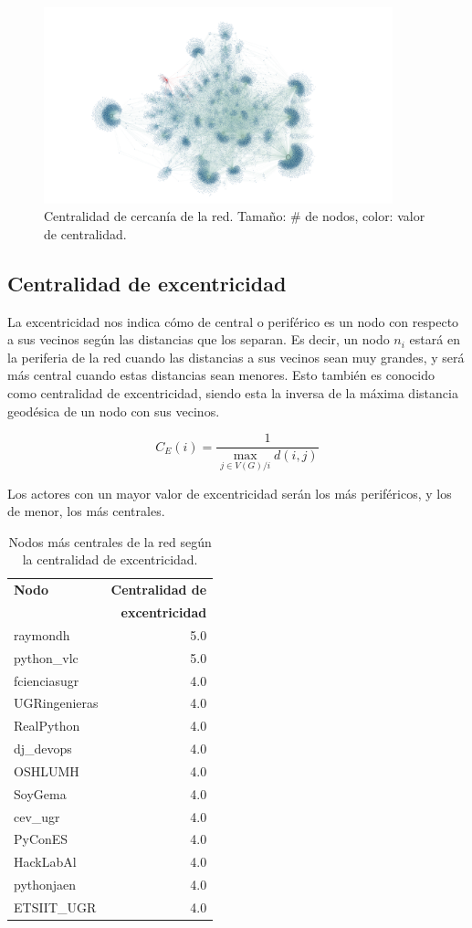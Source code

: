 \documentclass[paper=a4, fontsize=11pt]{article} %
\numberwithin{equation}{section} %
\numberwithin{figure}{section} %
\numberwithin{table}{section} %
\begin{document}
\begin{figure}[H]
  \centering
  \includegraphics[width=0.9\textwidth]{../Visualizaciones/close}
  \caption{Centralidad de cercanía de la red. Tamaño: \# de nodos, color: valor de centralidad.}
  \label{im4}
\end{figure}


\subsection{Centralidad de excentricidad}

La excentricidad nos indica cómo de central o periférico es un nodo con respecto a sus vecinos según las distancias que los separan. Es decir, un nodo $n_i$ estará en la periferia de la red cuando las distancias a sus vecinos sean muy grandes, y será más central cuando estas distancias sean menores. Esto también es conocido como centralidad de excentricidad, siendo esta la inversa de la máxima distancia geodésica de un nodo con sus vecinos.

\begin{displaymath}
  C_E(i) = \frac{1}{\max_{j \in V(G)/i}d(i,j)}
\end{displaymath}

Los actores con un mayor valor de excentricidad serán los más periféricos, y los de menor, los más centrales.

\begin{table}[H]
\begin{tabular}{l|r}
\textbf{Nodo} & \textbf{Centralidad de} \\
& \textbf{excentricidad} \\
\hline
raymondh & 5.0 \\
python\_vlc & 5.0 \\
fcienciasugr & 4.0 \\
UGRingenieras & 4.0 \\
RealPython & 4.0 \\
dj\_devops & 4.0 \\
OSHLUMH & 4.0 \\
SoyGema & 4.0 \\
cev\_ugr & 4.0 \\
PyConES & 4.0 \\
HackLabAl & 4.0 \\
pythonjaen & 4.0 \\
ETSIIT\_UGR & 4.0 \\
\end{tabular}
\label{eccen}
\caption{Nodos más centrales de la red según la centralidad de excentricidad.}
\end{table}
\end{document}
